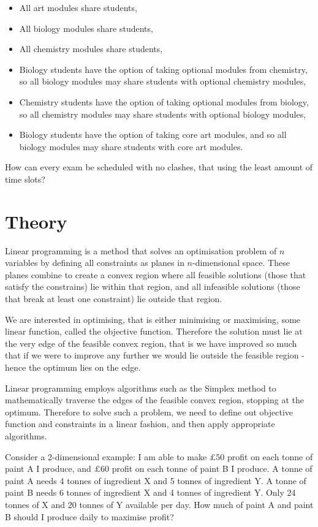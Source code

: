 \begin{itemize}
  \item All art modules share students,
  \item All biology modules share students,
  \item All chemistry modules share students,
  \item Biology students have the option of taking optional modules from
  chemistry, so all biology modules may share students with optional chemistry
  modules,
  \item Chemistry students have the option of taking optional modules from
  biology, so all chemistry modules may share students with optional biology
  modules,
  \item Biology students have the option of taking core art modules, and so all
  biology modules may share students with core art modules.
\end{itemize}

How can every exam be scheduled with no clashes, that using the least amount of
time slots?


\section{Theory}\label{sec:theory}
Linear programming is a method that solves an optimisation problem of $n$
variables by defining all constraints as planes in $n$-dimensional space. These
planes combine to create a convex region where all feasible solutions (those
that satisfy the constrains) lie within that region, and all infeasible
solutions (those that break at least one constraint) lie outside that region.

We are interested in optimising, that is either minimising or maximising, some
linear function, called the objective function. Therefore the solution must lie
at the very edge of the feasible convex region, that is we have improved so much
that if we were to improve any further we would lie outside the feasible region
- hence the optimum lies on the edge.

Linear programming employs algorithms such as the Simplex method to
mathematically traverse the edges of the feasible convex region, stopping at
the optimum. Therefore to solve such a problem, we need to define out objective
function and constraints in a linear fashion, and then apply appropriate
algorithms.

Consider a 2-dimensional example: I am able to make $\pounds 50$ profit on each
tonne of paint A I produce, and $\pounds 60$ profit on each tonne of paint B I
produce. A tonne of paint A needs 4 tonnes of ingredient X and 5 tonnes of
ingredient Y. A tonne of paint B needs 6 tonnes of ingredient X and 4 tonnes of
ingredient Y. Only 24 tonnes of X and 20 tonnes of Y available per day. How much
of paint A and paint B should I produce daily to maximise profit?

